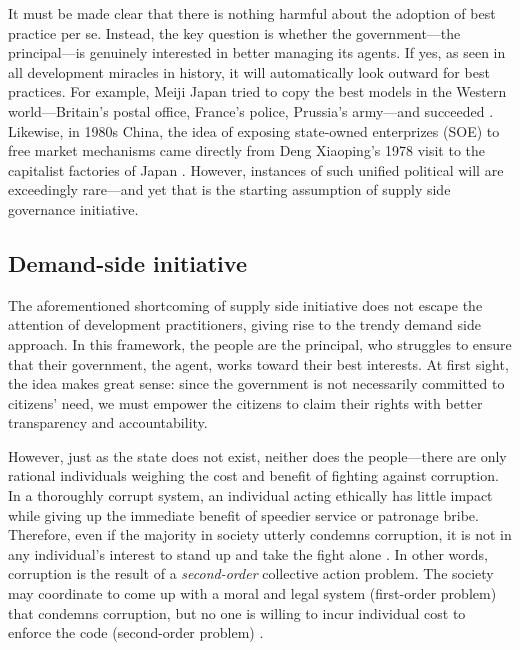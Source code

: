 \documentclass[12pt]{article}
\begin{document}
It must be made clear that there is nothing harmful about the adoption of best practice per se. Instead, the key question is whether the government---the principal---is genuinely interested in better managing its agents. If yes, as seen in all development miracles in history, it will automatically look outward for best practices. For example, Meiji Japan tried to copy the best models in the Western world---Britain's postal office, France's police, Prussia's army---and succeeded \citep{Krause2013}. Likewise, in 1980s China, the idea of exposing state-owned enterprizes (SOE) to free market mechanisms came directly from Deng Xiaoping's 1978 visit to the capitalist factories of Japan \citep{Coase2012}. However, instances of such unified political will are exceedingly rare---and yet that is the starting assumption of supply side governance initiative.

\subsection{Demand-side initiative} \label{sec:demandside}

The aforementioned shortcoming of supply side initiative does not escape the attention of development practitioners, giving rise to the trendy demand side approach. In this framework, the people are the principal, who struggles to ensure that their government, the agent, works toward their best interests. At first sight, the idea makes great sense: since the government is not necessarily committed to citizens' need, we must empower the citizens to claim their rights with better transparency and accountability.

However, just as the state does not exist, neither does the people---there are only rational individuals weighing the cost and benefit of fighting against corruption. In a thoroughly corrupt system, an individual acting ethically has little impact while giving up the immediate benefit of speedier service or patronage bribe. Therefore, even if the majority in society utterly condemns corruption, it is not in any individual's interest to stand up and take the fight alone \citep{Persson2010}. In other words, corruption is the result of a \textit{second-order} collective action problem. The society may coordinate to come up with a moral and legal system (first-order problem) that condemns corruption, but no one is willing to incur individual cost to enforce the code (second-order problem) \citep{Heckathorn1989}.
\end{document}
